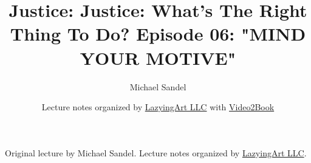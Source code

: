 \documentclass[11pt,oneside]{book}
\begin{document}
\frontmatter
\title{Justice: Justice: What's The Right Thing To Do? Episode 06: "MIND YOUR MOTIVE"}
\author{Michael Sandel}
\date{Lecture notes organized by \href{https://lazying.art}{LazyingArt LLC} with \href{https://github.com/lachlanchen/Video2Book}{Video2Book}}
\maketitle
\begin{center}
\small Original lecture by Michael Sandel. Lecture notes organized by \href{https://lazying.art}{LazyingArt LLC}.
\end{center}
\clearpage
\mainmatter

\end{document}
